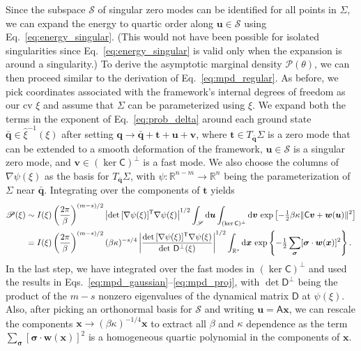 Since the subspace $\mathscr{S}$ of singular zero modes can be identified for all points in $\Sigma$, we can expand the energy to quartic order along $\bm{u} \in \mathscr{S}$ using Eq.~\eqref{eq:energy_singular}.
(This would not have been possible for isolated singularities since Eq.~\eqref{eq:energy_singular} is valid only when the expansion is around a singularity.)
To derive the asymptotic marginal density $\mathscr{P}(\theta)$, we can then proceed similar to the derivation of Eq.~\eqref{eq:mpd_regular}.
As before, we pick coordinates associated with the framework's internal degrees of freedom as our \ac{cv} $\xi$ and assume that $\Sigma$ can be parameterized using $\xi$.
We expand both the terms in the exponent of Eq.~\eqref{eq:prob_delta} around each ground state $\bar{\bm{q}} \in \hat{\xi}^{-1}(\xi)$ after setting $\bm{q} \to \bar{\bm{q}} + \bm{t} + \bm{u} + \bm{v}$, where $\bm{t} \in T_{\bar{\bm{q}}}\Sigma$ is a zero mode that can be extended to a smooth deformation of the framework, $\bm{u} \in \mathscr{S}$ is a singular zero mode, and $\bm{v} \in (\ker\mathsf{C})^{\perp}$ is a fast mode.
We also choose the columns of $\nabla\psi(\xi)$ as the basis for $T_{\bar{\bm{q}}}\Sigma$, with $\psi: \mathbb{R}^{n-m} \to \mathbb{R}^{n}$ being the parameterization of $\Sigma$ near $\bar{\bm{q}}$.
Integrating over the components of $\bm{t}$ yields
%
\begin{equation}
  \begin{aligned}
    \mathscr{P}(\xi) &\sim I(\xi)\left(\frac{2\pi}{\beta}\right)^{(m - s)/2} \left|\det\,[\nabla\psi(\xi)]^\mathsf{T}\nabla\psi(\xi)\right|^{1/2} \int_{\mathscr{S}} \mathrm{d}\bm{u} \int_{(\ker\mathsf{C})^{\perp}} \mathrm{d}\bm{v}\, \exp\left[-\tfrac{1}{2}\beta\kappa\lVert\mathsf{C}\bm{v} + \bm{w}(\bm{u})\rVert^{2}\right]\\
                                 &= I(\xi)\left(\frac{2\pi}{\beta}\right)^{(m - s)/2}(\beta\kappa)^{-s/4} \left|\frac{\det\,[\nabla\psi(\xi)]^\mathsf{T}\nabla\psi(\xi)}{\det\,\mathsf{D}^{\perp}(\xi)}\right|^{1/2} \int_{\mathbb{R}^{s}} \mathrm{d}\bm{x}\, \exp\left\{-\tfrac{1}{2}\sum_{\bm{\sigma}}[\bm{\sigma}\cdot\bm{w}(\bm{x})]^{2}\right\}.
  \end{aligned}
  \label{eq:mpd_perm}
\end{equation}
%
In the last step, we have integrated over the fast modes in $(\ker\mathsf{C})^{\perp}$ and used the results in Eqs.~\eqref{eq:mpd_gaussian}--\eqref{eq:mpd_proj}, with $\det\mathsf{D}^{\perp}$ being the product of the $m-s$ nonzero eigenvalues of the dynamical matrix $\mathsf{D}$ at $\psi(\xi)$.
Also, after picking an orthonormal basis for $\mathscr{S}$ and writing $\bm{u} = \mathsf{A}\bm{x}$, we can rescale the components $\bm{x} \to (\beta\kappa)^{-1/4}\bm{x}$ to extract all $\beta$ and $\kappa$ dependence as the term $\sum_{\bm{\sigma}} [\bm{\sigma}\cdot \bm{w}(\bm{x})]^{2}$ is a homogeneous quartic polynomial in the components of $\bm{x}$.
